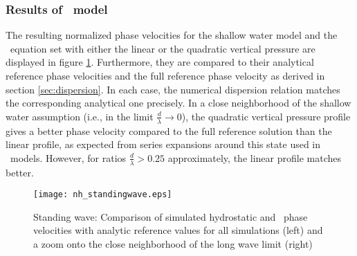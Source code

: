 \subsubsection{Results of \nh\ model}
The resulting normalized phase velocities for the shallow water model and the \nh\ equation set with either the linear or the quadratic vertical pressure are displayed in figure \ref{fig:nh_standingwave}. Furthermore, they are compared to their analytical reference phase velocities and the full reference phase velocity as derived in section \ref{sec:dispersion}. 
In each case, the numerical dispersion relation matches the corresponding analytical one precisely.
In a close neighborhood of the shallow water assumption (i.e., in the limit $\frac{d}{\lambda} \rightarrow 0$), the quadratic vertical pressure profile gives a better phase velocity compared to the full reference solution than the linear profile, as expected from series expansions around this state used in \Bt\ models.
However, for ratios $\frac{d}{\lambda} > 0.25$ approximately, the linear profile matches better.

\begin{figure}[htbp]
        \texttt{[image: nh\_standingwave.eps]}
        \caption{Standing wave: Comparison of simulated hydrostatic and \nh\ phase velocities with analytic reference values for all simulations (left) and a zoom onto the close neighborhood of the long wave limit (right)}
        \label{fig:nh_standingwave}
\end{figure}

